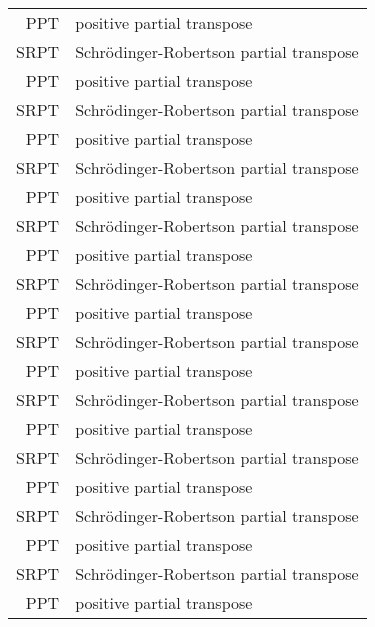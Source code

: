 \begin{longtable}{rl}
    PPT  & positive partial transpose                \\
    SRPT & Schr\"odinger-Robertson partial transpose \\
    PPT  & positive partial transpose                \\
    SRPT & Schr\"odinger-Robertson partial transpose \\
    PPT  & positive partial transpose                \\
    SRPT & Schr\"odinger-Robertson partial transpose \\
    PPT  & positive partial transpose                \\
    SRPT & Schr\"odinger-Robertson partial transpose \\
    PPT  & positive partial transpose                \\
    SRPT & Schr\"odinger-Robertson partial transpose \\
    PPT  & positive partial transpose                \\
    SRPT & Schr\"odinger-Robertson partial transpose \\
    PPT  & positive partial transpose                \\
    SRPT & Schr\"odinger-Robertson partial transpose \\
    PPT  & positive partial transpose                \\
    SRPT & Schr\"odinger-Robertson partial transpose \\
    PPT  & positive partial transpose                \\
    SRPT & Schr\"odinger-Robertson partial transpose \\
    PPT  & positive partial transpose                \\
    SRPT & Schr\"odinger-Robertson partial transpose \\
    PPT  & positive partial transpose
\end{longtable}
